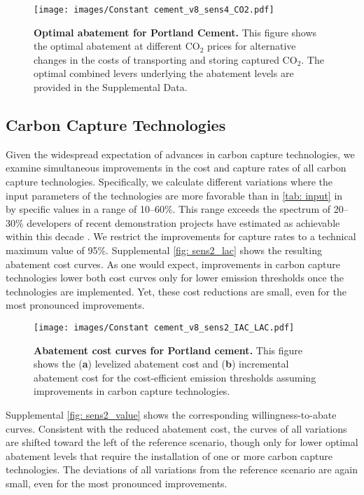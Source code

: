 \documentclass[12pt, a4paper]{article} %
\newcommand{\methods}{\nameref{sec: methods}} %
\newcommand{\Suppl}{Supplemental}
\begin{document}
\begin{figure}[ht]
\centering
\texttt{[image: images/Constant cement\_v8\_sens4\_CO2.pdf]}
\caption{\textbf{Optimal abatement for Portland Cement.} This figure shows the optimal abatement at different CO$_2$ prices for alternative changes in the costs of transporting and storing captured CO$_2$. The optimal combined levers underlying the abatement levels are provided in the \Suppl$ $ Data.}
\label{fig: sens4_co2}
\end{figure}


\newpage
\subsection{Carbon Capture Technologies}
\label{sec: sn-ccs}

Given the widespread expectation of advances in carbon capture technologies, we examine simultaneous improvements in the cost and capture rates of all carbon capture technologies. Specifically, we calculate different variations where the input parameters of the technologies are more favorable than in \autoref{tab: input} in \methods$ $ by specific values  in a range of 10--60\%. This range exceeds the spectrum of 20--30\% developers of recent demonstration projects have estimated as achievable within this decade \citep{kearns2021technology}. We restrict the improvements for capture rates to a technical maximum value of 95\%. \Suppl$ $ \autoref{fig: sens2_lac} shows the resulting abatement cost curves. As one would expect, improvements in carbon capture technologies lower both cost curves only for lower emission thresholds once the technologies are implemented. Yet, these cost reductions are small, even for the most pronounced improvements.

\begin{figure}[ht]
\centering
\texttt{[image: images/Constant cement\_v8\_sens2\_IAC\_LAC.pdf]}
\caption{\textbf{Abatement cost curves for Portland cement.} This figure shows the (\textbf{a}) levelized abatement cost and (\textbf{b}) incremental abatement cost for the cost-efficient emission thresholds assuming improvements in carbon capture technologies.}
\label{fig: sens2_lac}
\end{figure}

\newpage
\Suppl$ $ \autoref{fig: sens2_value} shows the corresponding willingness-to-abate curves. Consistent with the reduced abatement cost, the curves of all variations are shifted toward the left of the reference scenario, though only for lower optimal abatement levels that require the installation of one or more carbon capture technologies. The deviations of all variations from the reference scenario are again small, even for the most pronounced improvements.
\end{document}

